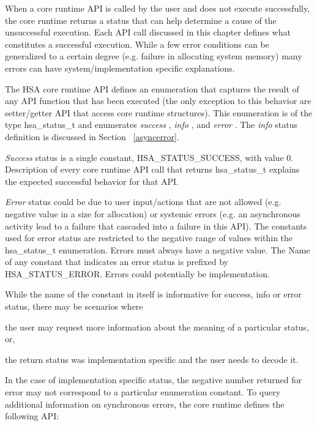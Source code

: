 \documentclass{book}
\newcommand{\emphld}[1]{\begin{DIFnomarkup} \emph{#1}
\end{DIFnomarkup}}
\newcommand{\reftyp}[1]{#1}
\newcommand{\refenu}[1]{\reftyp{#1}}
\newenvironment{DIFnomarkup}{}{}
\begin{document}
When a core runtime API is called by the user and does not execute
successfully, the core runtime returns a status that can help
determine a cause of the unsuccessful execution. Each API call
discussed in this chapter defines what constitutes a successful
execution. While a few error conditions can be generalized to a
certain degree (e.g. failure in allocating system memory) many
errors can have system/implementation specific explanations.

The HSA core runtime API defines an enumeration that captures the
result of any API function that has been executed (the only
exception to this behavior are setter/getter API that access core
runtime structures). This enumeration is of the type
\reftyp{hsa\_status\_t} and enumerates \emphld{success},
\emphld{info}, and \emphld{error}. The \emphld{info} status definition
is discussed in Section ~\ref{asyncerror}.

\vspace{3mm}\emphld{Success} status is a single constant,
\refenu{HSA\_STATUS\_SUCCESS}, with value 0. Description of every core
runtime API call that returns \reftyp{hsa\_status\_t} explains the
expected successful behavior for that API.

\emphld{Error} status could be due to user input/actions that are not
allowed (e.g. negative value in a size for allocation) or systemic
errors (e.g. an asynchronous activity lead to a failure that
cascaded into a failure in this API). The constants used for error
status are restricted to the negative range of values within the
\reftyp{hsa\_status\_t} enumeration. Errors must always have a
negative value. The Name of any constant that indicates an error status is
prefixed by \refenu{HSA\_STATUS\_ERROR}. Errors could potentially be
implementation.

While the name of the constant in itself is informative for success,
info or error status, there may be scenarios where
\begin{inparaenum}[(i)] \item the user may request more information
about the meaning of a particular status, or, \item the return
status was implementation specific and the user needs to decode it.
\end{inparaenum} In the case of implementation specific status, the
negative number returned for error may not correspond to a
particular enumeration constant. To query additional
information on synchronous errors, the core runtime defines the
following API:
\end{document}
